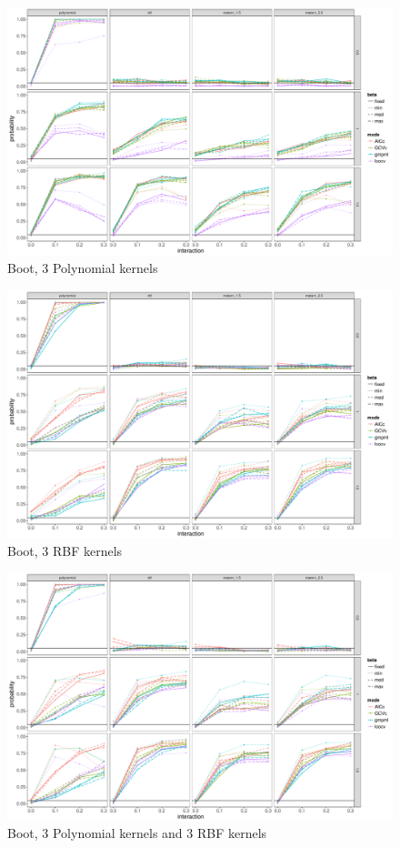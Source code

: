 \documentclass[11pt]{article}
\begin{document}
\begin{figure}
\begin{center}
\includegraphics[width=0.9\columnwidth]{exp_B2} 
\caption{Boot, 3 Polynomial kernels}
\label{fig:res}
\end{center}
\end{figure}

\begin{figure}
\begin{center}
\includegraphics[width=0.9\columnwidth]{exp_B3} 
\caption{Boot, 3 RBF kernels}
\label{fig:res}
\end{center}
\end{figure}

\begin{figure}
\begin{center}
\includegraphics[width=0.9\columnwidth]{exp_B4} 
\caption{Boot, 3 Polynomial kernels and 3 RBF kernels}
\label{fig:res}
\end{center}
\end{figure}
\end{document}
